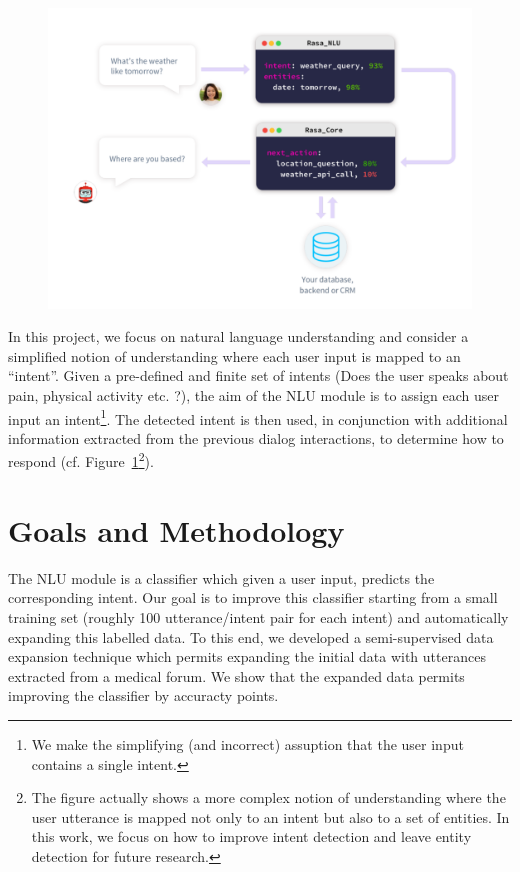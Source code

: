 \documentclass[11pt]{article}
\begin{document}
\begin{figure}[htbp]
\begin{center}
\includegraphics[width=.9\textwidth]{img/rasa.pdf}
\end{center}
\caption{}
\label{fig:rasa}
\end{figure}
In this project, we focus on natural language understanding and
consider a simplified notion of understanding where each user input is
mapped to an ``intent''. Given a pre-defined and finite set of intents
(Does the user speaks about pain, physical activity etc. ?), the aim
of the NLU module is to assign each user input an intent\footnote{We
  make the simplifying (and incorrect) assuption that the user input
  contains a single intent.}. The detected intent is then used, in
conjunction with additional information extracted from the previous
dialog interactions, to determine how to
respond (cf. Figure~\ref{fig:rasa}\footnote{The figure
  actually shows a more complex notion of understanding where the user
  utterance is mapped not only to an intent but also to a set of
  entities. In this work, we focus on how to improve intent detection
  and leave entity detection for future research.}).

\section{Goals and Methodology}
\label{sec:goals}


The NLU module is a classifier which given a user input, predicts the
corresponding intent. Our goal is to improve this classifier starting
from a small training set (roughly 100 utterance/intent pair for each
intent) and automatically expanding this labelled data. To this
end, we developed a semi-supervised data expansion technique which
permits expanding the initial data with utterances extracted from a
medical forum. We show that the expanded data permits improving the
classifier by  accuracty points.
\end{document}
